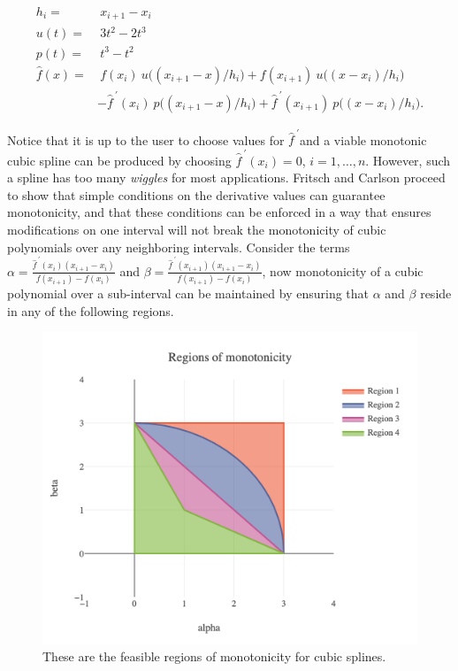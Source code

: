 \begin{align*}
h_i =& \ x_{i+1} - x_{i} \\
u(t) =& \ 3t^2 - 2t^3 \\
p(t) =& \ t^3 - t^2 \\
\hat f(x) =& \ f(x_i)\ u\big((x_{i+1} - x) / h_i\big) + f(x_{i+1})\ u\big((x - x_i) / h_i\big) \\
& - \hat f^{\ \prime}(x_i)\ p\big((x_{i+1}-x)/h_i\big) + \hat f^{\ \prime}(x_{i+1})\ p\big((x-x_i)/h_i \big).
\end{align*}

Notice that it is up to the user to choose values for $\hat f^{\ \prime}$and a viable monotonic cubic spline can be produced by choosing $\hat f^{\ \prime}(x_i) = 0$, $i = 1, \ldots, n$. However, such a spline has too many \textit{wiggles} for most applications. Fritsch and Carlson proceed to show that simple conditions on the derivative values can guarantee monotonicity, and that these conditions can be enforced in a way that ensures modifications on one interval will not break the monotonicity of cubic polynomials over any neighboring intervals. Consider the terms $\alpha = \frac{\hat f^{\ \prime}(x_i) (x_{i+1}-x_i)}{f(x_{i+1}) - f(x_i)}$ and $\beta = \frac{\hat f^{\ \prime}(x_{i+1}) (x_{i+1}-x_i)}{f(x_{i+1}) - f(x_i)}$, now monotonicity of a cubic polynomial over a sub-interval can be maintained by ensuring that $\alpha$ and $\beta$ reside in any of the following regions.

\begin{figure}[htb]
  \centering
  \includegraphics[scale=0.5]{Figures/splines/feasible_region.png}
  \caption{These are the feasible regions of monotonicity for cubic splines.}
  \label{fig:feasible_region}
\end{figure}

